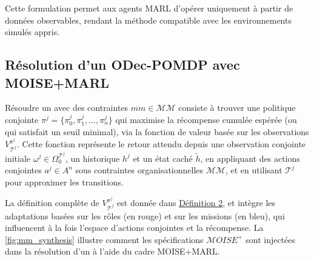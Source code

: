\noindent Cette formulation permet aux agents MARL d'opérer uniquement à partir de données observables, rendant la méthode compatible avec les environnements simulés appris.

\subsection*{Résolution d'un ODec-POMDP avec MOISE+MARL}

Résoudre un  avec des contraintes $mm \in \mathcal{MM}$ consiste à trouver une politique conjointe $\pi^j = \{\pi^j_0, \pi^j_1, \dots, \pi^j_n\}$ qui maximise la récompense cumulée espérée (ou qui satisfait un seuil minimal), via la fonction de valeur basée sur les observations $V_{\mathcal{T}^j}^{\pi^j}$. Cette fonction représente le retour attendu depuis une observation conjointe initiale $\omega^j \in \Omega^{\mathcal{T}^j}_0$, un historique $h^j$ et un état caché $\tilde{h}$, en appliquant des actions conjointes $a^j \in A^n$ sous contraintes organisationnelles $\mathcal{MM}$, et en utilisant $\mathcal{T}^j$ pour approximer les transitions.

La définition complète de $V_{\mathcal{T}^j}^{\pi^j}$ est donnée dans \hyperref[eq:single_value_function]{Définition 2}, et intègre les adaptations basées sur les rôles (en rouge) et sur les missions (en bleu), qui influencent à la fois l'espace d'actions conjointes et la récompense. La \autoref{fig:mm_synthesis} illustre comment les spécifications $\mathcal{M}OISE^+$ sont injectées dans la résolution d'un  à l'aide du cadre MOISE+MARL.

\medskip

